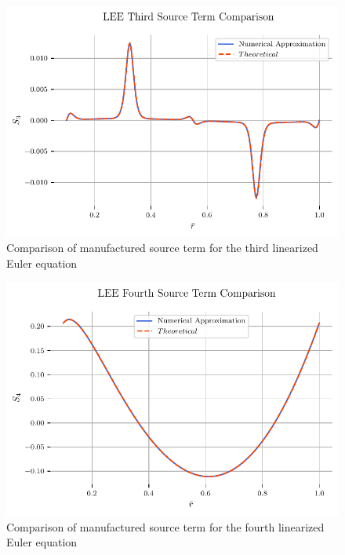 \begin{figure}[h!]
    \centering
    \includegraphics{../../../CodeRun/04-plotReport/tex-outputs/MMS1_SourceTermComparison3.pdf}
    \caption{Comparison of manufactured source term for the third linearized Euler equation}
\end{figure}

\begin{figure}[h!]
    \centering
    \includegraphics{../../../CodeRun/04-plotReport/tex-outputs/MMS1_SourceTermComparison4.pdf}
    \caption{Comparison of manufactured source term for the fourth linearized Euler equation}
\end{figure}




